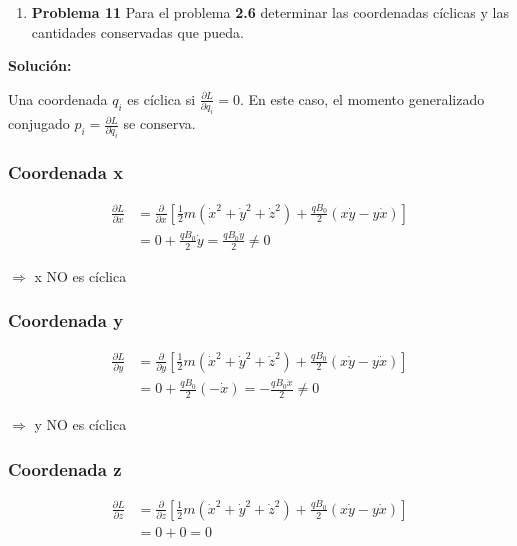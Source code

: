 \documentclass{article}
\begin{document}
\begin{enumerate}[label={{\textcolor{trueblue}{\textbf{Pr.} \arabic*.11}}}, start=2]
  \item \textbf{Problema 11} Para el problema \textcolor{trueblue}{\textbf{2.6}} determinar las coordenadas cíclicas y las cantidades conservadas que pueda.
\end{enumerate}

\textcolor{Cinnabar}{\textbf{Soluci\'on:}}


Una coordenada $q_i$ es cíclica si $\frac{\partial L}{\partial q_i} = 0$. En este caso, el momento generalizado conjugado $p_i = \frac{\partial L}{\partial \dot{q}_i}$ se conserva.

\subsubsection*{Coordenada x}

\begin{align}
\frac{\partial L}{\partial x} &= \frac{\partial}{\partial x}\left[\frac{1}{2}m(\dot{x}^2 + \dot{y}^2 + \dot{z}^2) + \frac{qB_0}{2}(x\dot{y} - y\dot{x})\right] \\
&= 0 + \frac{qB_0}{2}\dot{y} = \frac{qB_0 \dot{y}}{2} \neq 0
\end{align}

$\Rightarrow$ x NO es cíclica

\subsubsection*{Coordenada y}

\begin{align}
\frac{\partial L}{\partial y} &= \frac{\partial}{\partial y}\left[\frac{1}{2}m(\dot{x}^2 + \dot{y}^2 + \dot{z}^2) + \frac{qB_0}{2}(x\dot{y} - y\dot{x})\right] \\
&= 0 + \frac{qB_0}{2}(-\dot{x}) = -\frac{qB_0 \dot{x}}{2} \neq 0
\end{align}

$\Rightarrow$ y NO es cíclica

\subsubsection*{Coordenada z}

\begin{align}
\frac{\partial L}{\partial z} &= \frac{\partial}{\partial z}\left[\frac{1}{2}m(\dot{x}^2 + \dot{y}^2 + \dot{z}^2) + \frac{qB_0}{2}(x\dot{y} - y\dot{x})\right] \\
&= 0 + 0 = 0
\end{align}
\end{document}
